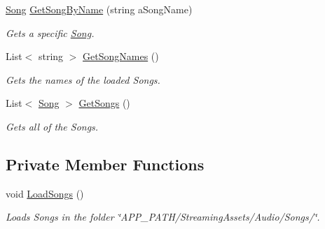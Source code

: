 \begin{DoxyCompactItemize}
\hyperlink{class_song}{Song} \hyperlink{group___s_m_pub_func_gafe818c55bd858c52c95a2fa7a566006a}{Get\+Song\+By\+Name} (string a\+Song\+Name)
\begin{DoxyCompactList}\small\item\em Gets a specific \hyperlink{class_song}{Song}. \end{DoxyCompactList}\item 
List$<$ string $>$ \hyperlink{group___s_m_pub_func_ga2a9455a763e35cfb6b242a82f7d797ae}{Get\+Song\+Names} ()
\begin{DoxyCompactList}\small\item\em Gets the names of the loaded Songs. \end{DoxyCompactList}\item 
List$<$ \hyperlink{class_song}{Song} $>$ \hyperlink{group___s_m_pub_func_ga3bf6a6d42a7c5e94cc85ba10eb9e6edb}{Get\+Songs} ()
\begin{DoxyCompactList}\small\item\em Gets all of the Songs. \end{DoxyCompactList}\end{DoxyCompactItemize}
\subsection*{Private Member Functions}
\begin{DoxyCompactItemize}
\item 
void \hyperlink{group___s_m_priv_func_ga73d6d3b38a160fd73b63b786b9cd384a}{Load\+Songs} ()
\begin{DoxyCompactList}\small\item\em Loads Songs in the folder \char`\"{}\+A\+P\+P\+\_\+\+P\+A\+T\+H/\+Streaming\+Assets/\+Audio/\+Songs/\char`\"{}. \end{DoxyCompactList}\end{DoxyCompactItemize}
